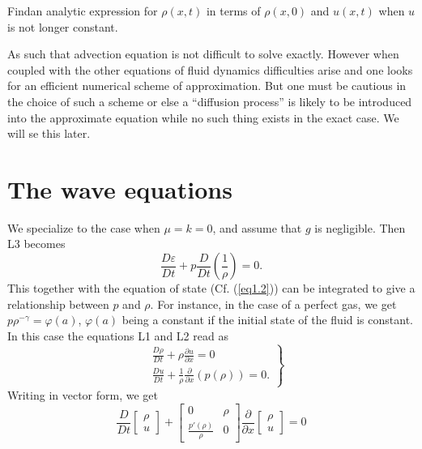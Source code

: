 \begin{exercise}\label{chap1:exer1.3}
Find\pageoriginale an analytic expression for $\rho (x,t)$ in terms
of $\rho (x,0)$ and $u(x,t)$ when $u$ is not longer constant.
\end{exercise}

\begin{remark}\label{chap1:rem1.3}
As such that advection equation is not difficult to solve
exactly. However when coupled with the other equations of fluid
dynamics difficulties arise and one looks for an efficient numerical
scheme of approximation. But one must be cautious in the choice of
such a scheme or else a ``diffusion process'' is likely to be
introduced into the approximate equation while no such thing exists in
the exact case. We will se this later.
\end{remark}

\section{The wave equations}\label{chap1:sec1.7}

We specialize to the case when $\mu = k=0$, and assume that $g$ is
negligible. Then L3 becomes
\begin{equation*}
\frac{D\varepsilon}{Dt} + p \frac{D}{Dt} \left(\frac{1}{\rho}\right) =
0. \tag{1.17} \label{eq1.17}
\end{equation*}
This together with the equation of state (Cf. (\ref{eq1.2})) can be integrated
to give a relationship between $p$ and $\rho$. For instance, in the
case of a perfect gas, we get $p \rho^{-\gamma} = \varphi(a)$,
$\varphi(a)$ being a constant if the initial state of the fluid is
constant. In this case the equations L1 and L2 read as 
\begin{equation*}
\left.
\begin{aligned}
& \frac{D\rho}{Dt} + \rho \frac{\partial u}{\partial x} = 0\\
& \frac{Du}{Dt} + \frac{1}{\rho} \frac{\partial}{\partial x}
(p(\rho)) =0.
\end{aligned} \right\}
\tag{1.18}\label{eq1.18}
\end{equation*}
Writing in vector form, we get
\begin{equation*}
\frac{D}{Dt} 
\begin{bmatrix}
\rho\\
u
\end{bmatrix} + 
\begin{bmatrix}
0 & \rho\\
\frac{p'(\rho)}{\rho} & 0
\end{bmatrix} \frac{\partial}{\partial x} 
\begin{bmatrix}
\rho\\
u
\end{bmatrix} =0
\tag{1.19}\label{eq1.19}
\end{equation*}

